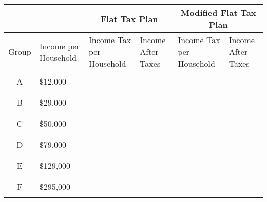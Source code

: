 \begin{exercises}
\begin{minipage}[t]{\textwidth}
\begin{center}
\begin{tabular}{|c | p{0.75in} | p{1.1in} | p{0.85in} | p{1.1in} | p{0.85in} |}
\hline
\multicolumn{2}{|c|}{} & \multicolumn{2}{c|}{Flat Tax Plan} & \multicolumn{2}{c|}{Modified Flat Tax Plan}\\
\hline
Group & Income per Household & Income Tax per Household & Income After Taxes & Income Tax per Household & Income After Taxes\\
\hline
& & & & & \\
A & \$12,000 & & & & \\
& & & & & \\
\hline
& & & & & \\
B & \$29,000 & & & & \\
& & & & & \\
\hline
& & & & & \\
C & \$50,000 & & & & \\
& & & & & \\
\hline
& & & & & \\
D & \$79,000 & & & & \\
& & & & & \\
\hline
& & & & & \\
E & \$129,000 & & & & \\
& & & & & \\
\hline
& & & & & \\
F & \$295,000 & & & & \\
& & & & & \\
\hline
\end{tabular}
\end{center}


\end{minipage}
\end{exercises}
